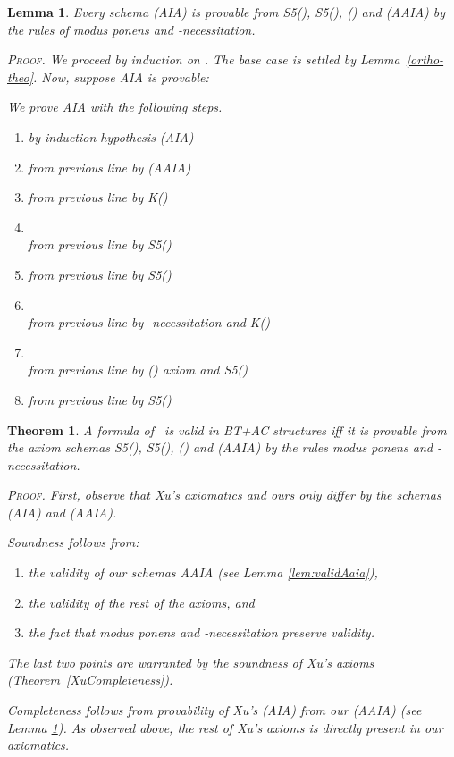 \documentclass{article}
\newtheorem{theorem}{Theorem}
\newtheorem{lemma}{Lemma}
\newenvironment{pf}{\em \medskip\noindent \textsc{Proof.}}
{\hspace*{\fill}\nolinebreak[2]\hspace*{\fill}\medskip}
\newcommand{\InclBox}[1]{}
\newcommand{\LCSTIT}{}
\begin{document}
\begin{lemma}
\label{provable-lemma}
Every schema (AIA) is provable from
S5(), S5(), (\InclBox{i})
and (AAIA)
by the rules of modus ponens and -necessitation.

\begin{pf}
We proceed by induction on . The base case  is settled
by \mbox{Lemma \ref{ortho-theo}}. Now, suppose AIA is
provable:

We prove AIA with the following steps.
\begin{enumerate}
\item   \hfill by induction
hypothesis (AIA)
\item   \hfill from
previous line by (AAIA)
\item  
\hfill from previous line by K()
\item \\
 \hfill from previous line by S5()
\item   \hfill from
previous line by S5()
\item \\
 \hfill from previous line by -necessitation and K()
\item \\
 \hfill from previous line by (\InclBox{i}) axiom and S5()
\item   \hfill from
previous line by S5()
\end{enumerate}

\end{pf}

\end{lemma}

\begin{theorem}
A formula of \LCSTIT\ is valid in BT+AC structures iff it is provable from the
axiom schemas S5(), S5(), (\InclBox{i}) and (AAIA) by the rules
modus ponens and -necessitation.

\begin{pf}
First, observe that Xu's axiomatics and ours only differ by the schemas
(AIA) and (AAIA).

Soundness follows from:
\begin{enumerate}
\item the validity of our schemas AAIA (see Lemma \ref{lem:validAaia}),
\item the validity of the rest of the axioms, and
\item the fact that modus ponens and -necessitation preserve validity.
\end{enumerate}
The last two points are warranted by the soundness of Xu's axioms
(Theorem~\ref{XuCompleteness}).

Completeness follows from provability of Xu's (AIA) from our (AAIA)
(see Lemma \ref{provable-lemma}).
As observed above, the rest of Xu's axioms is directly present in our axiomatics.
\end{pf}

\end{theorem}
\end{document}
